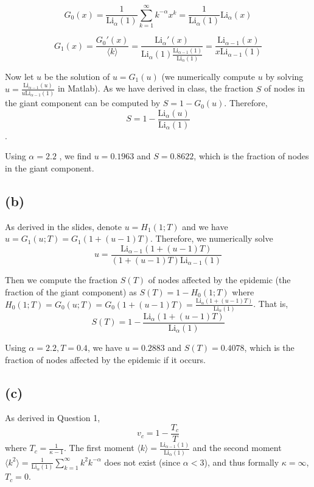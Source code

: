 \documentclass{article}
\begin{document}
$$ G_0(x) = \frac{1}{\mathrm{Li}_\alpha(1)}\sum_{k=1}^{\infty}k^{-\alpha}x^k = \frac{1}{\mathrm{Li}_\alpha(1)}\mathrm{Li}_\alpha(x)$$

$$ G_1(x) =\frac{G_0'(x)}{\langle k \rangle} =  \frac{\mathrm{Li}_\alpha '(x)}{\mathrm{Li}_\alpha(1) \frac{\mathrm{Li}_{\alpha-1}(1)}{\mathrm{Li}_\alpha(1)}} = \frac{\mathrm{Li}_{\alpha-1}(x)}{x\mathrm{Li}_{\alpha-1}(1)}$$

Now let $ u $ be the solution of $ u = G_1(u) $ (we  numerically compute $ u $ by solving $ u =   \frac{\mathrm{Li}_{\alpha-1}(u)}{u\mathrm{Li}_{\alpha-1}(1)}$ in Matlab). As we have derived in class, the fraction $ S $ of nodes in the giant component can be computed by $ S = 1 - G_0(u) $. Therefore, $$ S = 1 - \frac{\mathrm{Li}_\alpha(u)}{\mathrm{Li}_\alpha(1)} $$.

Using $ \alpha = 2.2 $ , we find $ u = 0.1963 $ and $ S = 0.8622 $, which is the fraction of nodes in the giant component.

\subsection*{(b)}
As derived in the slides, denote $ u = H_1(1;T) $ and we have $ u = G_1(u;T) = G_1(1+(u-1)T) $. Therefore, we numerically solve $$ u =  \frac{\mathrm{Li}_{\alpha-1}(1+(u-1)T)}{(1+(u-1)T)\mathrm{Li}_{\alpha-1}(1)}$$

Then we compute the fraction $ S(T) $ of nodes affected by the epidemic (the fraction of the giant component) as $ S(T) = 1 - H_0(1;T) $ where $ H_0(1;T) = G_0(u;T) =  G_0(1+(u-1)T) = \frac{\mathrm{Li}_\alpha(1+(u-1)T)}{\mathrm{Li}_\alpha(1)} $. That is, $$ S(T) = 1 - \frac{\mathrm{Li}_\alpha(1+(u-1)T)}{\mathrm{Li}_\alpha(1)} $$

Using $ \alpha=2.2, T=0.4 $, we have $ u =  0.2883 $ and $ S(T) = 0.4078
 $, which is the fraction of nodes affected by the epidemic if it occurs. 

\subsection*{(c)}
As derived in Question 1, $$v_c = 1 - \frac{T_c}{T} $$ where  $ T_c =    \frac{1}{\kappa - 1}$. The first moment $ \langle k \rangle = \frac{\mathrm{Li}_{\alpha-1}(1)}{\mathrm{Li}_{\alpha}(1)}$ and the second moment  $ \langle k^2 \rangle = \frac{1}{\mathrm{Li}_\alpha(1)}\sum_{k=1}^{\infty}k^2 k^{-\alpha} $ does not exist (since $ \alpha<3 $),  and thus formally $ \kappa = \infty $, $ T_c = 0 $.
\end{document}
